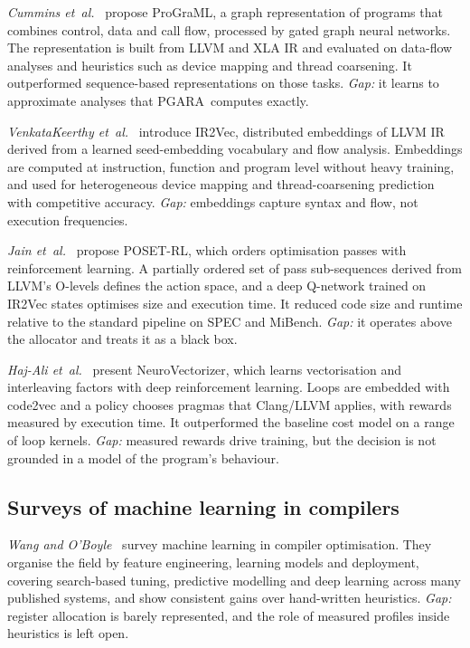 \documentclass[conference]{IEEEtran}
\newcommand{\MG}{PGARA}
\begin{document}
\textit{Cummins et~al.}~\cite{cummins2021programl} propose ProGraML, a
graph representation of programs that combines control, data and call
flow, processed by gated graph neural networks. The representation is
built from LLVM and XLA IR and evaluated on data-flow analyses and
heuristics such as device mapping and thread coarsening. It
outperformed sequence-based representations on those tasks.
\textit{Gap:} it learns to approximate analyses that \MG\ computes
exactly.

\textit{VenkataKeerthy et~al.}~\cite{venkatakeerthy2020ir2vec} introduce
IR2Vec, distributed embeddings of LLVM IR derived from a learned
seed-embedding vocabulary and flow analysis. Embeddings are computed at
instruction, function and program level without heavy training, and used
for heterogeneous device mapping and thread-coarsening prediction with
competitive accuracy. \textit{Gap:} embeddings capture syntax and flow,
not execution frequencies.

\textit{Jain et~al.}~\cite{jain2022posetrl} propose POSET-RL, which
orders optimisation passes with reinforcement learning. A partially
ordered set of pass sub-sequences derived from LLVM's O-levels defines
the action space, and a deep Q-network trained on IR2Vec states optimises
size and execution time. It reduced code size and runtime relative to
the standard pipeline on SPEC and MiBench. \textit{Gap:} it operates
above the allocator and treats it as a black box.

\textit{Haj-Ali et~al.}~\cite{hajali2020neurovectorizer} present
NeuroVectorizer, which learns vectorisation and interleaving factors
with deep reinforcement learning. Loops are embedded with code2vec and a
policy chooses pragmas that Clang/LLVM applies, with rewards measured by
execution time. It outperformed the baseline cost model on a range of
loop kernels. \textit{Gap:} measured rewards drive training, but the
decision is not grounded in a model of the program's behaviour.

\subsection{Surveys of machine learning in compilers}

\textit{Wang and O'Boyle}~\cite{wang2018ml} survey machine learning in
compiler optimisation. They organise the field by feature engineering,
learning models and deployment, covering search-based tuning,
predictive modelling and deep learning across many published systems,
and show consistent gains over hand-written heuristics.
\textit{Gap:} register allocation is barely represented, and the role of
measured profiles inside heuristics is left open.
\end{document}
